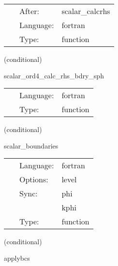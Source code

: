  \begin{tabular*}{160mm}{cll} 
~ & After:  & scalar\_calcrhs \\ 
~ & Language:  & fortran \\ 
~ & Type:  & function \\ 
\end{tabular*} 


\vspace{5mm}

   (conditional) 

\hspace{5mm} scalar\_ord4\_calc\_rhs\_bdry\_sph 

\hspace{5mm}{\it mol boundary rhs calculation for scalar variables for the multipatch system } 


\hspace{5mm}

 \begin{tabular*}{160mm}{cll} 
~ & Language:  & fortran \\ 
~ & Type:  & function \\ 
\end{tabular*} 


\vspace{5mm}

   (conditional) 

\hspace{5mm} scalar\_boundaries 

\hspace{5mm}{\it mol boundary enforcement for scalar variables } 


\hspace{5mm}

 \begin{tabular*}{160mm}{cll} 
~ & Language:  & fortran \\ 
~ & Options:  & level \\ 
~ & Sync:  & phi \\ 
~& ~ &kphi\\ 
~ & Type:  & function \\ 
\end{tabular*} 


\vspace{5mm}

   (conditional) 

\hspace{5mm} applybcs 

\hspace{5mm}{\it apply boundary conditions } 


